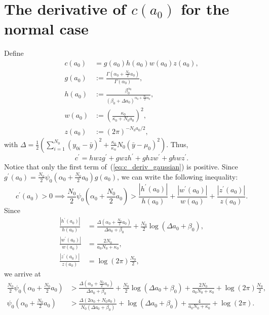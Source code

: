 \documentclass[a4paper, notitlepage, 11pt]{article}
\begin{document}
\section{The derivative of $c(a_0)$ for the normal case}
\label{sec:ca0_norm_deriv}
Define
\begin{align*}
 c(a_0) &= g(a_0)h(a_0)w(a_0)z(a_0), \\
 g(a_0) &:=  \frac{\Gamma\left( \alpha_0 + \frac{N_0}{2}a_0 \right)}{\Gamma(\alpha_0)}, \\
 h(a_0) &:= \frac{\beta_0^{\alpha_0}}{ \left(  \beta_0 + \Delta a_0\right)^{\alpha_0 + \frac{N_0}{2}a_0}}, \\
 w(a_0) &:= \left(\frac{\kappa_0}{\kappa_0 + N_0 a_0} \right)^2 , \\
 z(a_0) &:= (2\pi)^{-N_0 a_0/2}, 
\end{align*}
with $\Delta =  \frac{1}{2}\left( \sum_{i=1}^{N_0}(y_{0i}-\bar{y})^2 + \frac{\kappa_0}{\kappa_n} N_0 (\bar{y}-\mu_0)^2 \right)$.
Thus,
\begin{equation}
\label{eq:c_deriv_gaussian}
 c^\prime = h w z g^\prime + g w z h^\prime + g h z w^\prime + g h w z^\prime.
\end{equation}
Notice that only the first term of~(\ref{eq:c_deriv_gaussian}) is positive.
Since $g^\prime(a_0) = \frac{N_0}{2} \psi_0\left( \alpha_0 +  \frac{N_0}{2} a_0 \right)g(a_0)$, we can write the following inequality:
\begin{equation}
 c^\prime(a_0) > 0 \implies \frac{N_0}{2} \psi_0\left( \alpha_0 +  \frac{N_0}{2} a_0 \right) > \frac{|h^\prime(a_0)|}{h(a_0)} + \frac{|w^\prime(a_0)|}{w(a_0)} + \frac{|z^\prime(a_0)|}{z(a_0)}.
\end{equation}
Since
\begin{align}
 \frac{|h^\prime(a_0)|}{h(a_0)}  &=  \frac{\Delta\left( \alpha_0 + \frac{N_0}{2} a_0 \right) }{\Delta a_0 + \beta_0} + \frac{N_0}{2}\log{\left( \Delta a_0+ \beta_0 \right) }, \\
 \frac{|w^\prime(a_0)|}{w(a_0)}  &= \frac{2N_0}{a_0N_0+\kappa_0},\\
\frac{|z^\prime(a_0)|}{z(a_0)}  &= \log(2\pi) \frac{N_0}{2},
\end{align}
we arrive at
\begin{align}
 \frac{N_0}{2} \psi_0\left( \alpha_0 +  \frac{N_0}{2} a_0 \right) &>  \frac{\Delta\left( \alpha_0 + \frac{N_0}{2} a_0 \right) }{\Delta a_0 + \beta_0} + \frac{N_0}{2}\log{\left( \Delta a_0+ \beta_0 \right) } + \frac{2N_0}{a_0N_0+\kappa_0} + \log(2\pi) \frac{N_0}{2}, \\
\psi_0\left( \alpha_0 +  \frac{N_0}{2} a_0 \right) &>  \frac{\Delta\left( 2\alpha_0 + N_0a_0 \right) }{N_0\left(\Delta a_0 + \beta_0\right)} + \log{\left( \Delta a_0+ \beta_0 \right) } + \frac{4}{a_0N_0+\kappa_0} + \log(2\pi).
\end{align}
\end{document}
